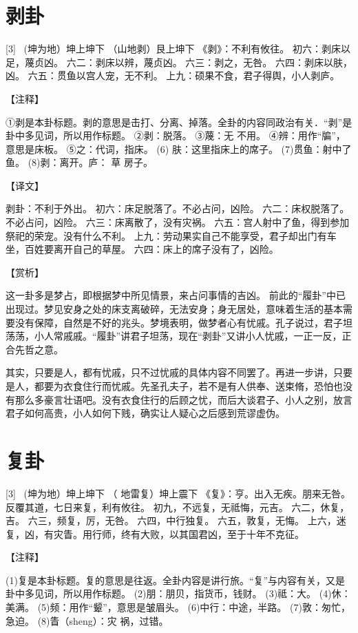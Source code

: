 \documentclass[12pt,UTF8]{ctexbook}
\begin{document}
\chapter{剥卦}

[3] \ (坤为地）坤上坤下
（山地剥）艮上坤下
《剥》：不利有攸往。
初六：剥床以足，蔑贞凶。
六二：剥床以辨，蔑贞凶。
六三：剥之，无咎。
六四：剥床以肤，凶。
六五：贯鱼以宫人宠，无不利。
上九：硕果不食，君子得舆，小人剥庐。

【注释】

①剥是本卦标题。剥的意思是击打、分离、掉落。全卦的内容同政治有关．“剥”是卦中多见词，所以用作标题。
②剥：脱落。
③蔑：无 不用。
④辨：用作“牑”，意思是床板。
⑤之：代词，指床。
(6) 肤：这里指床上的席子。
(7)贯鱼：射中了鱼。
(8)剥：离开。庐： 草 房子。

【译文】

剥卦：不利于外出。
初六：床足脱落了。不必占问，凶险。
六二：床权脱落了。不必占问，凶险。
六三：床离散了，没有灾祸。
六五：宫人射中了鱼，得到参加祭祀的荣宠。没有什么不利。
上九：劳动果实自己不能享受，君子却出门有车坐，百姓要离开自己的草屋。
六四：床上的席子没有了，凶险。

【赏析】

这一卦多是梦占，即根据梦中所见情景，来占问事情的吉凶。 前此的“履卦”中已出现过。梦见安身之处的床支离破碎，无法安身；身无居处，意味着生活的基本需要没有保障，自然是不好的兆头。梦境表明，做梦者心有忧戚。孔子说过，君子坦荡荡，小人常戚戚。“履卦”讲君子坦荡，现在“剥卦”又讲小人忧戚，一正一反，正合先哲之意。

其实，只要是人，都有忧戚，只不过忧戚的具体内容不同罢了。再进一步讲，只要是人，都要为衣食住行而忧戚。先圣孔夫子，若不是有人供奉、送束脩，恐怕也没有那么多豪言壮语吧。没有衣食住行的后顾之忧，而后大谈君子、小人之别，放言君子如何高贵，小人如何下贱，确实让人疑心之后感到荒谬虚伪。
\chapter{复卦}

[3] \ (坤为地）坤上坤下
（ 地雷复）坤上震下
《复》：亨。出入无疾。朋来无咎。反覆其道，七日来复，利有攸往。
初九，不远复，无祗悔，元吉。
六二，休复，吉。
六三，频复，厉，无咎。
六四，中行独复。
六五，敦复，无悔。
上六，迷复，凶，有灾眚。用行师，终有大败，以其国君凶，至于十年不克征。

【注释】

(1)复是本卦标题。复的意思是往返。全卦内容是讲行旅。“复”与内容有关，又是卦中多见词，所以用作标题。
(2)朋：朋贝，指货币，钱财。
(3)祗：大。
(4)休：美满。
(5)频：用作“颦”，意思是皱眉头。
(6)中行：中途，半路。
(7)敦：匆忙，急迫。
(8)眚（sheng）：灾 祸，过错。
\end{document}
